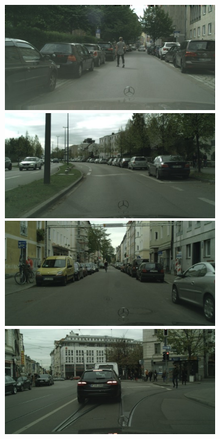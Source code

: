{\begin{figure}[t]
{{\begin{subfigure}[t]{0.24\linewidth}
\begin{center}
		\includegraphics[width=\linewidth,trim={0px 60px 0 0px},clip]{qualitative/bielefeld_000000_027586_leftImg8bit.jpg}
		\includegraphics[width=\linewidth,trim={0px 60px 0 0px},clip]{qualitative/munich_000026_000019_leftImg8bit.jpg}
		\includegraphics[width=\linewidth,trim={0px 60px 0 0px},clip]{qualitative/munich_000306_000019_leftImg8bit.jpg}
		\includegraphics[width=\linewidth,trim={0px 60px 0 0px},clip]{qualitative/munich_000316_000019_leftImg8bit.jpg}

\end{center}
\end{subfigure}}}
\end{figure}}
